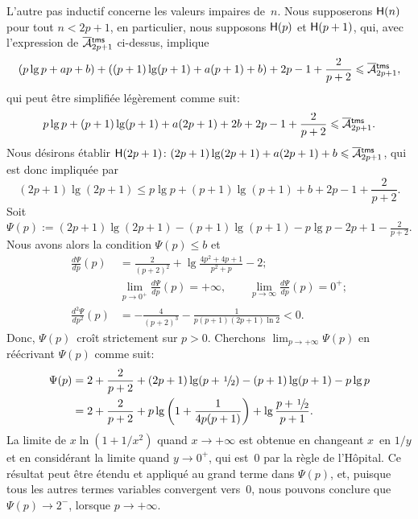 L'autre pas inductif concerne les valeurs impaires de~\(n\). Nous
supposerons \(\textsf{H}({n})\) pour tout \(n < 2p+1\), en particulier,
nous supposons \(\textsf{H}({p})\) et \(\textsf{H}({p+1})\), qui, avec
l'expression de \(\OM{\fun{tms}}{2p+1}\) ci-dessus, implique
\begin{equation*}
(p\lg p + ap + b) + ((p+1)\lg(p+1) + a(p+1) + b) + 2p - 1 +
\frac{2}{p+2} \leqslant \OM{\fun{tms}}{2p+1},
\end{equation*}
qui peut être simplifiée légèrement comme suit:
\begin{equation*}
p\lg p + (p+1)\lg(p+1) + a(2p+1) + 2b + 2p - 1 + \frac{2}{p+2}
\leqslant \OM{\fun{tms}}{2p+1}.
\end{equation*}
Nous désirons établir \(\pred{H}{2p+1} \colon (2p+1)\lg(2p+1) +
a(2p+1) + b \leqslant \OM{\fun{tms}}{2p+1}\), qui est donc impliquée
par
\begin{equation*}
  (2p+1)\lg(2p+1) \leqslant
  p\lg p + (p+1)\lg(p+1) + b + 2p - 1 + \frac{2}{p+2}.
\end{equation*}
Soit \(\Psi(p) := (2p+1)\lg(2p+1) - (p+1)\lg(p+1) - p\lg p - 2p + 1 -
\frac{2}{p+2}\). Nous avons alors la condition \(\Psi(p) \leqslant
b\) et
\begin{align*}
\frac{d\Psi}{dp}(p) &= \frac{2}{(p+2)^2}
+ \lg\frac{4p^2 + 4p + 1}{p^2 + p} - 2;\\
& \lim_{p \to 0^{+}} \frac{d\Psi}{dp}(p) = +\infty,\qquad
\lim_{p \to \infty}  \frac{d\Psi}{dp}(p) = 0^{+};\\
\frac{d^2\Psi}{dp^2}(p) &= -\frac{4}{(p+2)^3} - \frac{1}{p(p+1)(2p+1)\ln
  2} < 0.
\end{align*}
Donc, \(\Psi(p)\)~croît strictement sur \(p > 0\). Cherchons \(\lim_{p
  \to +\infty}\Psi(p)\) en réécrivant \(\Psi(p)\) comme suit:
\begin{align*}
\Psi(p)
  &= 2 + \frac{2}{p+2} + (2p+1)\lg(p+\myfrac{1}/{2}) - (p+1)\lg(p+1)
     - p\lg p\\
  &= 2 + \frac{2}{p+2} + p\lg\left(1 + \frac{1}{4p(p+1)}\right) +
  \lg\frac{p + \myfrac{1}/{2}}{p+1}.
\end{align*}
La limite de \(x\ln(1+1/x^2)\) quand \(x \to +\infty\) est obtenue en
changeant \(x\)~en \(1/y\) et en considérant la limite quand \(y \to
0^{+}\), qui est~\(0\) par la règle de l'Hôpital. Ce résultat peut
être étendu et appliqué au grand terme dans \(\Psi(p)\), et, puisque
tous les autres termes variables convergent vers~\(0\), nous pouvons
conclure que \(\Psi(p) \to 2^{-}\), lorsque \(p \to +\infty\).

